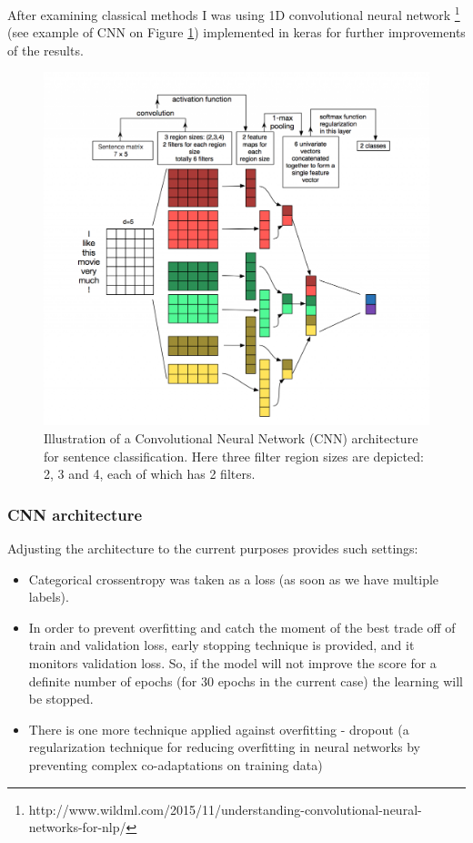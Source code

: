 \documentclass[12pt,a4paper]{article}
\begin{document}
After examining classical methods I was using 1D convolutional neural network \footnote{http://www.wildml.com/2015/11/understanding-convolutional-neural-networks-for-nlp/} (see example of CNN on Figure \ref{fig:cnn}) implemented in keras for further improvements of the results. 

\begin{figure}
\centering
\includegraphics[width=1\textwidth]{figures/cnn.png}
\caption{Illustration of a Convolutional Neural Network (CNN) architecture for sentence classification. Here  three filter region sizes are depicted: 2, 3 and 4, each of which has 2 filters. }
\label{fig:cnn}
\end{figure}

\subsubsection{CNN architecture}
Adjusting the architecture to the current purposes provides such settings:
\begin{itemize}
\item Categorical crossentropy was taken as a loss (as soon as we have multiple labels). 
\item In order to prevent overfitting and catch the moment of the best trade off of train and validation loss, early stopping technique is provided, and it monitors validation loss. So, if the model will not improve the score for a definite number of epochs (for 30 epochs in the current case) the learning will be stopped.
\item There is one more technique applied against overfitting - dropout (a regularization technique for reducing overfitting in neural networks by preventing complex co-adaptations on training data)
\end{itemize}
\end{document}
